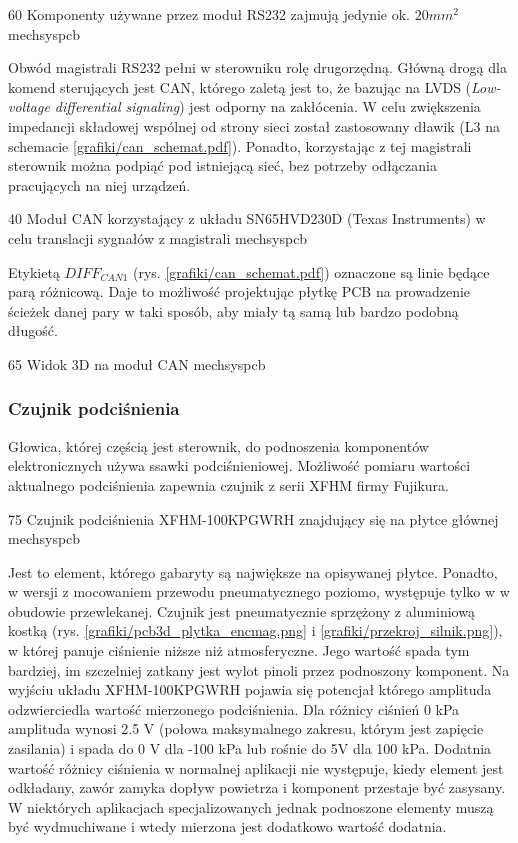 	{60}
	{Komponenty używane przez moduł RS232 zajmują jedynie ok. $ 20 mm^2 $}
	{mechsyspcb}

Obwód magistrali RS232 pełni w sterowniku rolę drugorzędną. Główną drogą dla komend sterujących jest CAN, którego zaletą jest to, że bazując na LVDS ({\it Low-voltage differential signaling}) jest odporny na zakłócenia. W celu zwiększenia impedancji składowej wspólnej od strony sieci został zastosowany dławik (L3 na schemacie \ref{grafiki/can_schemat.pdf}). Ponadto, korzystając z tej magistrali sterownik można podpiąć pod istniejącą sieć, bez potrzeby odłączania pracujących na niej urządzeń.

	{40}
	{Moduł CAN korzystający z układu SN65HVD230D (Texas Instruments) w celu translacji sygnałów z magistrali}
	{mechsyspcb}
	
Etykietą $ DIFF_{CAN1} $ (rys. \ref{grafiki/can_schemat.pdf}) oznaczone są linie będące parą różnicową. Daje to możliwość projektując płytkę PCB na prowadzenie ścieżek danej pary w taki sposób, aby miały tą samą lub bardzo podobną długość.

	{65}
	{Widok 3D na moduł CAN}
	{mechsyspcb}
	
\subsubsection{Czujnik podciśnienia}
\label{sss:pressure_sensor}

Głowica, której częścią jest sterownik, do podnoszenia komponentów elektronicznych używa ssawki podciśnieniowej. Możliwość pomiaru wartości aktualnego podciśnienia zapewnia czujnik z serii XFHM firmy Fujikura. 

	{75}
	{Czujnik podciśnienia XFHM-100KPGWRH znajdujący się na płytce głównej}
	{mechsyspcb}

Jest to element, którego gabaryty są największe na opisywanej płytce. Ponadto, w wersji z mocowaniem przewodu pneumatycznego poziomo, występuje tylko w w obudowie przewlekanej. Czujnik jest pneumatycznie sprzężony z aluminiową kostką (rys. \ref{grafiki/pcb3d_plytka_encmag.png} i \ref{grafiki/przekroj_silnik.png}), w której panuje ciśnienie niższe niż atmosferyczne. Jego wartość spada tym bardziej, im szczelniej zatkany jest wylot pinoli przez podnoszony komponent. Na wyjściu układu XFHM-100KPGWRH pojawia się potencjał którego amplituda odzwierciedla wartość mierzonego podciśnienia. Dla różnicy ciśnień 0 kPa amplituda wynosi 2.5 V (połowa maksymalnego zakresu, którym jest zapięcie zasilania) i spada do 0 V dla -100 kPa lub rośnie do 5V dla 100 kPa. Dodatnia wartość różnicy ciśnienia w normalnej aplikacji nie występuje, kiedy element jest odkładany, zawór zamyka dopływ powietrza i komponent przestaje być zasysany. W niektórych aplikacjach specjalizowanych jednak podnoszone elementy muszą być wydmuchiwane i wtedy mierzona jest dodatkowo wartość dodatnia. \\

